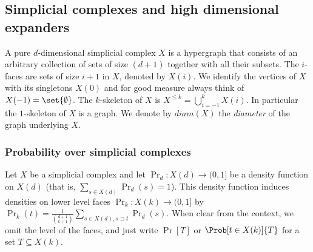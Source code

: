 \subsection{Simplicial complexes and high dimensional expanders}
A pure \(d\)-dimensional simplicial complex \(X\) is a hypergraph that consists of an arbitrary collection of sets of size \((d+1)\) together with all their subsets. The $i$-faces are sets of size \(i+1\) in \(X\), denoted by \(X(i)\). We identify the vertices of \(X\) with its singletons \(X(0)\) and for good measure always think of \(X(-1) = \set{\emptyset}\). The \(k\)-skeleton of \(X\) is \(X^{\leq k} = \bigcup_{i=-1}^k X(i)\). In particular the \(1\)-skeleton of \(X\) is a graph. We denote by \(diam(X)\) the \emph{diameter} of the graph underlying $X$.

%

\subsubsection{Probability over simplicial complexes}
Let \(X\) be a simplicial complex and let \(\Pr_d:X(d)\to (0,1]\) be a density function on \(X(d)\) (that is, \(\sum_{s \in X(d)}\Pr_d(s)=1\)). This density function induces densities on lower level faces \(\Pr_k:X(k)\to (0,1]\) by \(\Pr_k(t) = \frac{1}{\binom{d+1}{k+1}}\sum_{s \in X(d),s \supset t} \Pr_d(s)\). %
When clear from the context, we omit the level of the faces, and just write \(\Pr[T]\) or \(\Prob[t \in X(k)]{T}\) for a set \(T \subseteq X(k)\).

